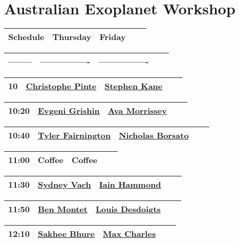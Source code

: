 \documentclass{article}
\begin{document}
\section{Australian Exoplanet Workshop}
\begin{longtable}{|c | c | c | c | c|}
\hline
Schedule & Thursday & Friday \\
\hline
\end{longtable}
\begin{longtable}{|c | c | c | c | c|}
\hline
-------- & ---------------- & ---------------- \\
\hline
\end{longtable}
\begin{longtable}{|c | c | c | c | c|}
\hline
10 & \href{speakers/christophe-pinte/_index.md}{Christophe Pinte} & \href{speakers/stephen-kane/_index.md}{Stephen Kane} \\
\hline
\end{longtable}
\begin{longtable}{|c | c | c | c | c|}
\hline
10:20 & \href{speakers/evgeni-grishin/_index.md}{Evgeni Grishin} & \href{speakers/ava-morrissey/_index.md}{Ava Morrissey} \\
\hline
\end{longtable}
\begin{longtable}{|c | c | c | c | c|}
\hline
10:40 & \href{speakers/tyler-fairnington/_index.md}{Tyler Fairnington} & \href{speakers/nicholas-borsato/_index.md}{Nicholas Borsato} \\
\hline
\end{longtable}
\begin{longtable}{|c | c | c | c | c|}
\hline
11:00 & Coffee & Coffee \\
\hline
\end{longtable}
\begin{longtable}{|c | c | c | c | c|}
\hline
11:30 & \href{speakers/sydney-vach/_index.md}{Sydney Vach} & \href{speakers/iain-hammond/_index.md}{Iain Hammond} \\
\hline
\end{longtable}
\begin{longtable}{|c | c | c | c | c|}
\hline
11:50 & \href{speakers/ben-montet/_index.md}{Ben Montet} & \href{speakers/louis-desdoigts/_index.md}{Louis Desdoigts} \\
\hline
\end{longtable}
\begin{longtable}{|c | c | c | c | c|}
\hline
12:10 & \href{speakers/sakhee-bhure/_index.md}{Sakhee Bhure} & \href{speakers/max-charles/_index.md}{Max Charles} \\
\hline
\end{longtable}
\end{document}
